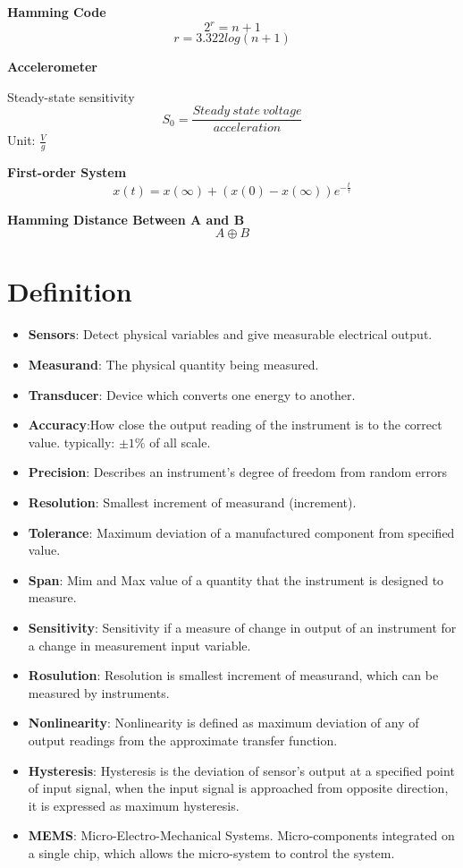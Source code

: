 \documentclass{article}
\begin{document}
	
	\textbf{Hamming Code}
	$$2^r = n+1$$
	$$ r = 3.322log(n+1)$$
	
	\textbf{Accelerometer}
	
	Steady-state sensitivity
	$$ S_0 = \frac{Steady\ state \ voltage}{acceleration} $$ 
	Unit: $\frac{V}{g}$
	
	\textbf{First-order System}
	$$x(t) = x(\infty) + (x(0) - x(\infty))e^{-\frac{t}{\tau}}$$
	
	\textbf{Hamming Distance Between A and B}
	$$A \oplus B$$
	
	
	
	\section{Definition}
	\begin{itemize}
		
		\item \textbf{Sensors}: Detect physical variables and give measurable electrical output.
		\item \textbf{Measurand}: The physical quantity being measured.
		\item \textbf{Transducer}: Device which converts one energy to another.
		\item \textbf{Accuracy}:How close the output reading of the instrument is to the correct value.
		typically: $\pm 1\%$ of all scale.
		\item \textbf{Precision}: Describes an instrument’s degree of freedom from random errors
		\item \textbf{Resolution}: Smallest increment of measurand (increment).
		\item \textbf{Tolerance}: Maximum deviation of a manufactured component from specified value.
		\item \textbf{Span}: Mim and Max value of a quantity that the instrument is designed to measure.
		\item \textbf{Sensitivity}: Sensitivity if a measure of change in output of an instrument for a change in measurement input variable.
		\item \textbf{Rosulution}: Resolution is smallest increment of measurand, which can be measured by instruments.
		
		\item \textbf{Nonlinearity}: Nonlinearity is defined as maximum deviation of any of output readings from the approximate transfer function.
		
		\item \textbf{Hysteresis}: Hysteresis is the deviation of sensor's output at a specified point of input signal, when the input signal is approached from opposite direction, it is expressed as maximum hysteresis.
		
		\item \textbf{MEMS}: Micro-Electro-Mechanical Systems. Micro-components integrated on a single chip, which allows the micro-system to control the system.

	\end{itemize}
	
\end{document}
